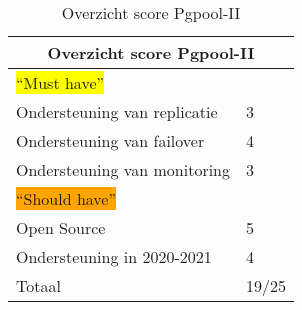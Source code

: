 \begin{table}[!h]
    \centering
    \begin{tabular}{ |p{6cm}||p{6cm}|  }
        \hline
        \multicolumn{2}{|c|}{Overzicht score Pgpool-II} \\
        \hline
        \colorbox{yellow}{“Must have”} & \\
        \hline
        Ondersteuning van replicatie  & 3 \\
        Ondersteuning van failover &  4 \\
        Ondersteuning van monitoring & 3 \\
        \hline
        \colorbox{orange}{“Should have”} & \\
        \hline
        Open Source &  5 \\
        Ondersteuning in 2020-2021 & 4 \\
        \hline
        \hline
        Totaal & 19/25 \\
        \hline
    \end{tabular}
    \caption{Overzicht score Pgpool-II}
    \label{table:Overzicht score Pgpool-II}
\end{table}
